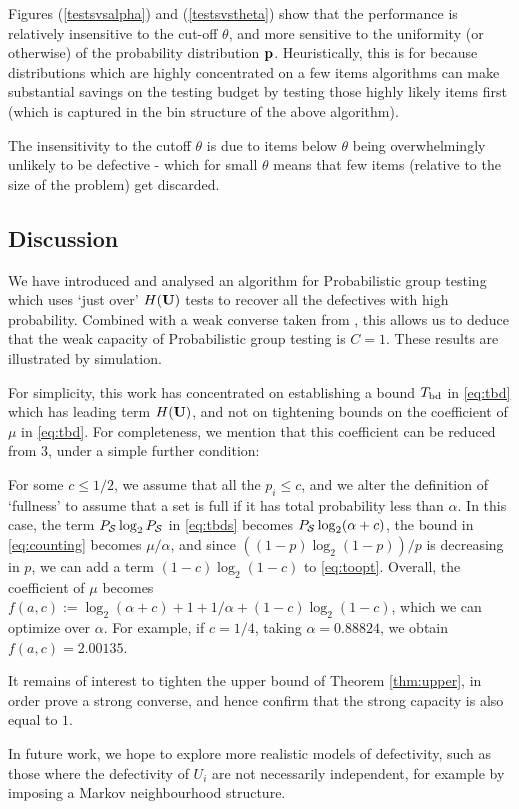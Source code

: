 Figures (\ref{testsvsalpha}) and (\ref{testsvstheta}) show that the performance is relatively insensitive to the cut-off \(\theta\), and more sensitive to the uniformity (or otherwise) of the probability distribution \({\mathbf{ p}}\). Heuristically, this is for because distributions which are highly concentrated on a few items algorithms can make substantial savings on the testing budget by testing those highly likely items first (which is captured in the bin structure of the above algorithm). 

The insensitivity to the cutoff \(\theta\) is due to items below \(\theta\) being overwhelmingly unlikely to be defective - which for small \(\theta\) means that few items (relative to the size of the problem) get discarded.

\subsection{Discussion}
We have introduced and analysed an algorithm for Probabilistic group testing which uses `just over' $H({\mathbf{ U}})$ tests to
recover all the defectives with high probability. Combined with a weak converse taken from \cite{li5}, this allows us to deduce that
the weak capacity of Probabilistic group testing is $C=1$.  
These results are illustrated by simulation.

For simplicity, this work has concentrated on establishing a bound $T_{{\rm bd}}$ in \eqref{eq:tbd} which has leading term $H({\mathbf{ U}})$,
and not on tightening bounds on the coefficient of $\mu$ in \eqref{eq:tbd}. For completeness, we mention that this coefficient
can be reduced from 3, under a simple further condition:

\begin{remark}
For some $c \leq 1/2$, we assume that all the $p_i \leq c$, and we alter the definition of `fullness' to assume that a set is
full if it has total probability less than $\alpha$. In this case, the term $P_{{\mathcal{S}}} \log_2 P_{{\mathcal{S}}}$ in \eqref{eq:tbds}
becomes $P_{{\mathcal{S}}} \log_2 (\alpha + c)$, the bound in \eqref{eq:counting} becomes $\mu/\alpha$, and since
$\left( (1-p) \log_2 (1-p) \right)/p$ is decreasing in $p$, we can add a term $(1-c) \log_2 (1-c) $ to \eqref{eq:toopt}.
Overall, the coefficient of $\mu$ becomes $f(a,c) := \log_2 (\alpha + c) + 1 + 1/\alpha + (1-c) \log_2(1-c)$, which we can optimize over
$\alpha$. For example, if $c = 1/4$, taking $\alpha = 0.88824$, we obtain $f(a,c) = 2.00135$.
\end{remark}

It remains of interest to tighten the upper bound of Theorem \ref{thm:upper},
in order prove a strong converse, and hence confirm that the strong capacity is also equal to $1$.

In future work, we hope to explore more realistic models of defectivity, such as those where the defectivity of $U_i$ are not
necessarily independent, for example by imposing a Markov neighbourhood structure.

